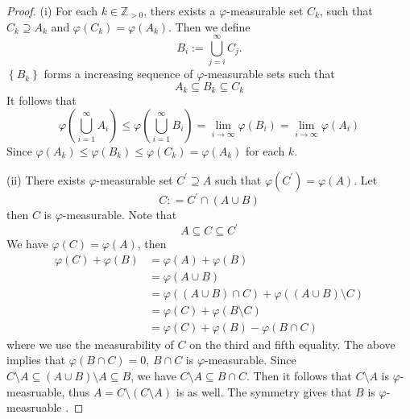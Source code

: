 \documentclass[../main.tex]{subfiles}
\begin{document}
\begin{proof}
    (i) For each \(  k\in \mathbb{Z} _{> 0}  \), thers exists a \( \varphi  \)-measurable set \(  C_{k}  \), such that \(  C_{k}\supseteq A_{k}  \) and \(   \varphi \left( C_{k} \right)=  \varphi \left( A_{k} \right)    \). Then we define \[
    B_{i}:= \bigcup _{j= i}^{\infty}C_{j}.
    \]\(  \left\{ B_{k} \right\}  \) forms a increasing sequence of \(   \varphi   \)-measurable sets such that  \[
    A_{k}\subseteq B_{k}\subseteq C_{k}
    \]It follows that \[
     \varphi \left( \bigcup _{i= 1}^{\infty}A_{i} \right)\le  \varphi \left( \bigcup _{i= 1}^{\infty}B_{i} \right)= \lim_{i\to \infty} \varphi \left( B_{i} \right)= \lim_{i\to \infty} \varphi \left( A_{i} \right)
    \] Since \(   \varphi \left( A_{k} \right)\le  \varphi \left( B_{k} \right)\le  \varphi \left( C_{k} \right)=  \varphi \left( A_{k} \right)      \)          for each \(  k  \). 
    
    (ii) There exists \(   \varphi   \)-measurable set \(  C^{\prime} \supseteq A  \) such that \(   \varphi \left( C^{\prime}  \right)=  \varphi \left( A \right)    \). Let \[
    C: =  C^{\prime} \cap \left( A\cup B \right) 
    \] then \(  C  \) is \(   \varphi   \)-measurable. Note that \[
    A\subseteq C\subseteq C^{\prime} 
    \]We have  \(   \varphi \left( C \right)=  \varphi \left( A \right)    \), then \[
    \begin{aligned}
     \varphi \left( C \right)+  \varphi \left( B \right)&=  \varphi \left( A \right)+  \varphi \left( B \right)\\ 
      &=  \varphi \left( A\cup B \right)\\ 
       &=  \varphi \left( \left( A\cup B \right)\cap C  \right)+  \varphi \left( \left( A\cup B \right)\setminus C  \right)\\ 
        &=  \varphi \left( C \right)+  \varphi \left( B\setminus C \right)\\ 
         &=  \varphi \left( C \right)+  \varphi \left( B \right)- \varphi \left( B\cap C \right)         
    \end{aligned}
    \] where we use the measurability of \(  C  \) on the third and fifth equality. The above implies that \(   \varphi \left( B\cap C \right)= 0   \), \(  B\cap C  \) is \(   \varphi   \)-measurable. Since \(  C\setminus A\subseteq \left( A\cup B \right)\setminus A\subseteq B   \), we have \(  C\setminus A\subseteq B\cap C   \). Then it follows that  \(  C\setminus A  \) is \(   \varphi   \)-measruable, thus \(  A= C\setminus \left( C\setminus A \right)   \) is as well. The symmetry  gives that \(  B  \) is \(   \varphi   \)-measruable .   
\end{proof}
\end{document}
